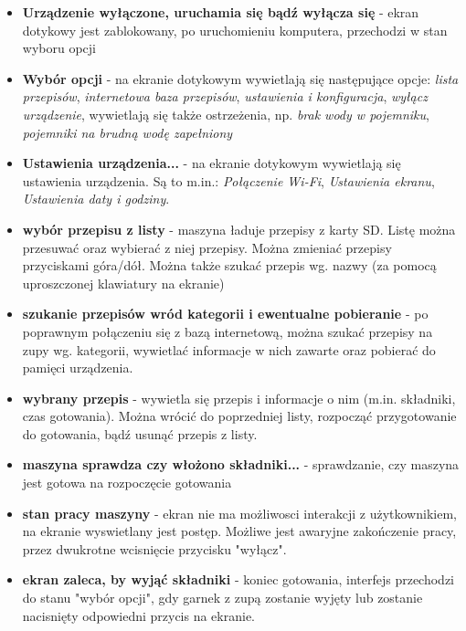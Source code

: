 \documentclass[12pt,a4paper,notitlepage]{report}
\begin{document}
\begin{itemize}

\item \textbf{Urządzenie wyłączone, uruchamia się bądź wyłącza się} - ekran dotykowy jest zablokowany, po uruchomieniu komputera, przechodzi w stan wyboru opcji
\item \textbf{Wybór opcji} - na ekranie dotykowym wywietlają się następujące opcje: \emph{lista przepisów}, \emph{internetowa baza przepisów}, \emph{ustawienia i konfiguracja}, \emph{wyłącz urządzenie}, wywietlają się także ostrzeżenia, np. \emph{brak wody w pojemniku}, \emph{pojemniki na brudną wodę zapełniony} 
\item \textbf{Ustawienia urządzenia...} - na ekranie dotykowym wywietlają się ustawienia urządzenia. Są to m.in.: \emph{Połączenie Wi-Fi}, \emph{Ustawienia ekranu}, \emph{Ustawienia daty i godziny}.
\item \textbf{wybór przepisu z listy} - maszyna ładuje przepisy z karty SD. Listę można przesuwać oraz wybierać z niej przepisy. Można zmieniać przepisy przyciskami góra/dół. Można także szukać przepis wg. nazwy (za pomocą uproszczonej klawiatury na ekranie)
\item \textbf{szukanie przepisów wród kategorii i ewentualne pobieranie} - po poprawnym połączeniu się z bazą internetową, można szukać przepisy na zupy wg. kategorii, wywietlać informacje w nich zawarte oraz pobierać do pamięci urządzenia. 
\item \textbf{wybrany przepis} - wywietla się przepis i informacje o nim (m.in. składniki, czas gotowania). Można wrócić do poprzedniej listy, rozpocząć przygotowanie do gotowania, bądź usunąć przepis z listy.
\item \textbf{maszyna sprawdza czy włożono składniki...} - sprawdzanie, czy maszyna jest gotowa na rozpoczęcie gotowania
\item \textbf{stan pracy maszyny} - ekran nie ma możliwosci interakcji z użytkownikiem, na ekranie wyswietlany jest postęp. Możliwe jest awaryjne zakończenie pracy, przez dwukrotne wcisnięcie przycisku "wyłącz".
\item \textbf{ekran zaleca, by wyjąć składniki} - koniec gotowania, interfejs przechodzi do stanu "wybór opcji", gdy garnek z zupą zostanie wyjęty lub zostanie nacisnięty odpowiedni przycis na ekranie.

\end{itemize}
\end{document}
